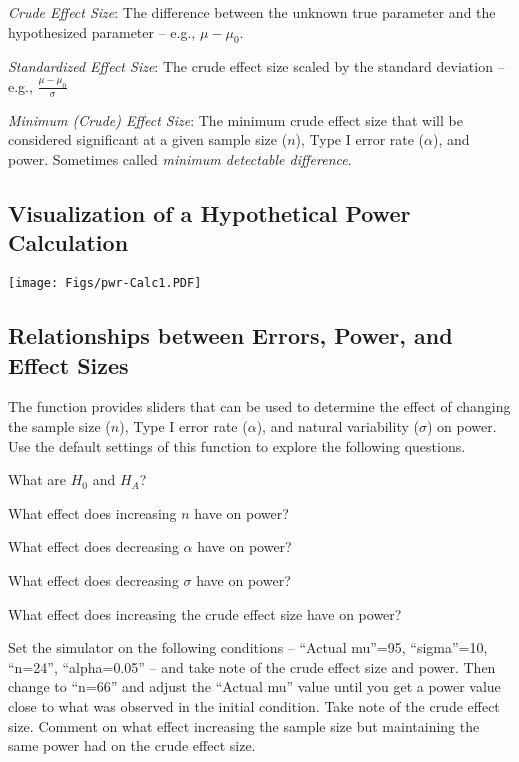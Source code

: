 \documentclass{article}\usepackage{graphicx, color}
\begin{document}
\begin{Itemize}
  \item \emph{Crude Effect Size}: The difference between the unknown true parameter and the hypothesized parameter -- e.g., $\mu-\mu_{0}$.
  \item \emph{Standardized Effect Size}: The crude effect size scaled by the standard deviation -- e.g., $\frac{\mu-\mu_{0}}{\sigma}$
  \item \emph{Minimum (Crude) Effect Size}: The minimum crude effect size that will be considered significant at a given sample size ($n$), Type I error rate ($\alpha$), and power.  Sometimes called \emph{minimum detectable difference}.
\end{Itemize}

\subsection{Visualization of a Hypothetical Power Calculation}

\texttt{[image: Figs/pwr-Calc1.PDF]}

\subsection{Relationships between Errors, Power, and Effect Sizes}
The  function provides sliders that can be used to determine the effect of changing the sample size ($n$), Type I error rate ($\alpha$), and natural variability ($\sigma$) on power.  Use the default settings of this function to explore the following questions.

\begin{Enumerate}
  \item What are $H_{0}$ and $H_{A}$?
  \item What effect does increasing $n$ have on power?
  \item What effect does decreasing $\alpha$ have on power?
  \item What effect does decreasing $\sigma$ have on power?
  \item What effect does increasing the crude effect size have on power? 
  \item Set the simulator on the following conditions -- ``Actual mu''=95, ``sigma''=10, ``n=24'', ``alpha=0.05'' -- and take note of the crude effect size and power.  Then change to ``n=66'' and adjust the ``Actual mu'' value until you get a power value close to what was observed in the initial condition.  Take note of the crude effect size.  Comment on what effect increasing the sample size but maintaining the same power had on the crude effect size.
\end{Enumerate}
\end{document}
